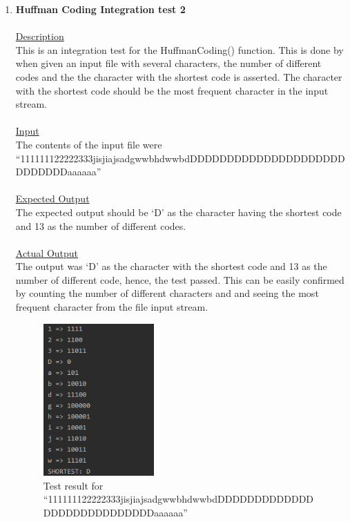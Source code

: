 \documentclass{article}
\newcommand{\quotes}[1]{``#1''}
\begin{document}
\begin{enumerate}
					\item \textbf{Huffman Coding Integration test 2}\\\\
		\underline{Description}\\
		\indent This is an integration test for the HuffmanCoding() function. This is done by when given an input file with several characters, the number of different codes and the the character with the shortest code is asserted. The character with the shortest code should be the most frequent character in the input stream.\\\\
		\underline{Input}\\
		\indent The contents of the input file were \quotes{111111122222333jisjiajsadgwwbhdwwbdDDDDDDDDDDDDDDDDDDDDDDDDDDDDaaaaaa}\\	\\
		\underline{Expected Output}\\
		\indent The expected output should be `D' as the character having the shortest code and 13 as the number of different codes.\\\\
		\underline{Actual Output}\\
		The output was `D' as the character with the shortest code and 13 as the number of different code, hence, the test passed. This can be easily confirmed by counting the number of different characters and and seeing the most frequent character from the file input stream.
				\begin{figure}[H]
					\centering
			 			\includegraphics[width=0.4\textwidth]{hctest2.png}
			 			\centering
			  			\caption{Test result for \quotes{111111122222333jisjiajsadgwwbhdwwbdDDDDDDDDDDDDDDDDDDDDDDDDDDDDaaaaaa}}
			  			\label{fig:hctest2}
					\end{figure}
					

\end{enumerate}
\end{document}
